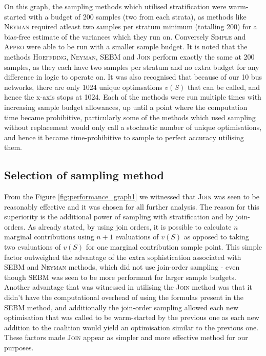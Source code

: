 On this graph, the sampling methods which utilised stratification were warm-started with a budget of 200 samples (two from each strata), as methods like \textsc{Neyman} required atleast two samples per stratum minimum (totalling 200) for a bias-free estimate of the variances which they run on.
Conversely \textsc{Simple} and \textsc{Appro} were able to be run with a smaller sample budget.
It is noted that the methods \textsc{Hoeffding}, \textsc{Neyman}, \textsc{SEBM} and \textsc{Join} perform exactly the same at 200 samples, as they each have two samples per stratum and no extra budget for any difference in logic to operate on.
It was also recognised that because of our 10 bus networks, there are only 1024 unique optimsations $v(S)$ that can be called, and hence the x-axis stops at 1024.
Each of the methods were run multiple times with increasing sample budget allowances, up until a point where the computation time became prohibitive, particularly some of the methods which used sampling without replacement would only call a stochastic number of unique optimisations, and hence it became time-prohibitive to sample to perfect accuracy utilising them.

\subsection{Selection of sampling method}\label{subsection:selection_of_sampling_method}

From the Figure \ref{fig:performance_graph1} we witnessed that \textsc{Join} was seen to be reasonably effective and it was chosen for all further analysis.
The reason for this superiority is the additional power of sampling with stratification and by join-orders.
As already stated, by using join orders, it is possible to calculate $n$ marginal contributions using $n+1$ evaluations of $v(S)$ as opposed to taking two evaluations of $v(S)$ for one marginal contribution sample point.
This simple factor outweighed the advantage of the extra sophistication associated with \textsc{SEBM} and \textsc{Neyman} methods, which did not use join-order sampling - even though SEBM was seen to be more performant for larger sample budgets.
Another advantage that was witnessed in utilising the \textsc{Join} method was that it didn't have the computational overhead of using the formulas present in the \textsc{SEBM} method, and additionally the join-order sampling allowed each new optimisation that was called to be warm-started by the previous one as each new addition to the coalition would yield an optimisation similar to the previous one.
These factors made \textsc{Join} appear as simpler and more effective method for our purposes.

